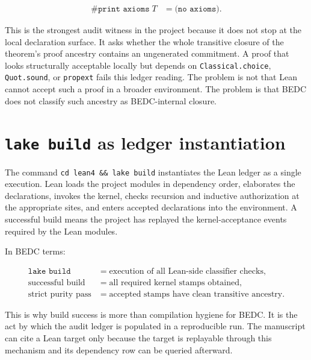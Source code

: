 $$
\begin{aligned}
\texttt{\#print axioms}\; T
&= \texttt{(no axioms)}.
\end{aligned}
$$

This is the strongest audit witness in the project because it does not stop at
the local declaration surface. It asks whether the whole transitive closure of
the theorem's proof ancestry contains an ungenerated commitment. A proof that
looks structurally acceptable locally but depends on \texttt{Classical.choice},
\texttt{Quot.sound}, or \texttt{propext} fails this ledger reading. The problem
is not that Lean cannot accept such a proof in a broader environment. The
problem is that BEDC does not classify such ancestry as BEDC-internal closure.

\section{\texttt{lake build} as ledger instantiation}
\label{sec:kernel-audit-witness-lake-build}

The command \texttt{cd lean4 \&\& lake build} instantiates the Lean ledger as a
single execution. Lean loads the project modules in dependency order, elaborates
the declarations, invokes the kernel, checks recursion and inductive
authorization at the appropriate sites, and enters accepted declarations into
the environment. A successful build means the project has replayed the
kernel-acceptance events required by the Lean modules.

In BEDC terms:

$$
\begin{aligned}
\texttt{lake build}
&= \text{execution of all Lean-side classifier checks},\\
\text{successful build}
&= \text{all required kernel stamps obtained},\\
\text{strict purity pass}
&= \text{accepted stamps have clean transitive ancestry}.
\end{aligned}
$$

This is why build success is more than compilation hygiene for BEDC. It is the
act by which the audit ledger is populated in a reproducible run. The manuscript
can cite a Lean target only because the target is replayable through this
mechanism and its dependency row can be queried afterward.


